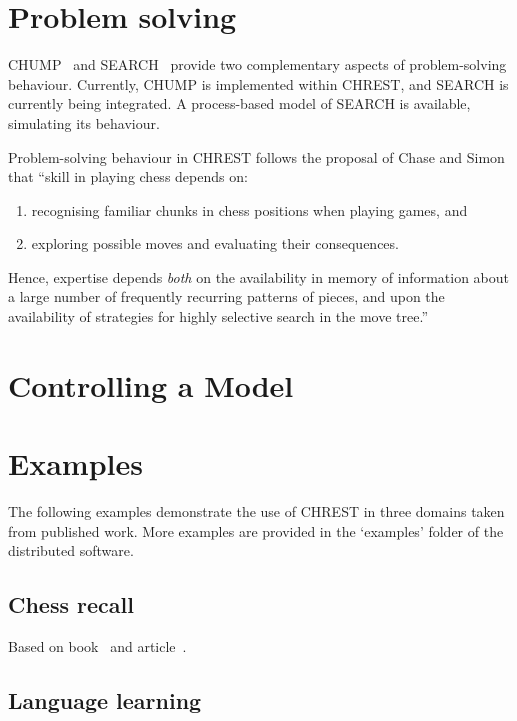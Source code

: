 \documentclass{article}
\begin{document}
\section{Problem solving}

CHUMP~\cite{Gobet94} and SEARCH~\cite{Gobet97a} provide two complementary 
aspects of problem-solving behaviour.  Currently, CHUMP is implemented 
within CHREST, and SEARCH is currently being integrated.  A process-based 
model of SEARCH is available, simulating its behaviour.

Problem-solving behaviour in CHREST follows the proposal of Chase and
Simon~\cite{Chase73} that ``skill in playing chess depends on:

\begin{enumerate}
\item recognising familiar chunks in chess positions when playing games, and
\item exploring possible moves and evaluating their consequences.
\end{enumerate}

Hence, expertise depends {\em both} on the availability in memory of
information about a large number of frequently recurring patterns of pieces,
and upon the availability of strategies for highly selective search in the move
tree.''~\cite{Gobet97a}

\section{Controlling a Model}

\section{Examples}

The following examples demonstrate the use of CHREST in three domains taken
from published work.  More examples are provided in the `examples' folder of
the distributed software.

\subsection{Chess recall}

Based on book~\cite{deGroot96} and article~\cite{Gobet00b}.

\subsection{Language learning}
\end{document}
